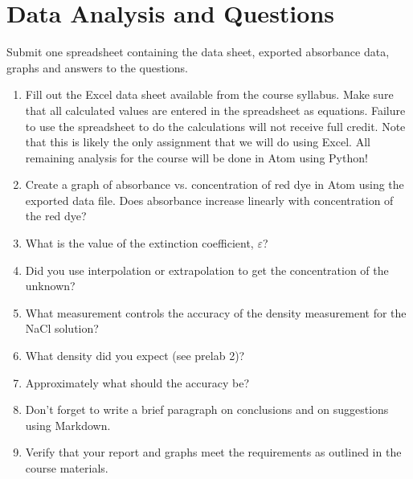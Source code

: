 \documentclass[letterpaper,10pt,english]{sphinxmanual}
\begin{document}
\section{Data Analysis and Questions}
\label{\detokenize{Laboratory_Measurements/Laboratory_Measurements:data-analysis-and-questions}}\label{\detokenize{Laboratory_Measurements/Laboratory_Measurements:heading-laboratory-measurements-and-procedures-data-analysis-and-questions}}
Submit one spreadsheet containing the data sheet, exported absorbance data, graphs and answers to the questions.
\begin{enumerate}
\item {} 
Fill out the Excel data sheet available from the course syllabus. Make sure that all calculated values are entered in the spreadsheet as equations. Failure to use the spreadsheet to do the calculations will not receive full credit. Note that this is likely the only assignment that we will do using Excel. All remaining analysis for the course will be done in Atom using Python!

\item {} 
Create a graph of absorbance vs. concentration of red dye  in Atom using the exported data file. Does absorbance increase linearly with concentration of the red dye?

\item {} 
What is the value of the extinction coefficient, \(\varepsilon\)?

\item {} 
Did you use interpolation or extrapolation to get the concentration of the unknown?

\item {} 
What measurement controls the accuracy of the density measurement for the NaCl solution?

\item {} 
What density did you expect (see prelab 2)?

\item {} 
Approximately what should the accuracy be?

\item {} 
Don’t forget to write a brief paragraph on conclusions and on suggestions using Markdown.

\item {} 
Verify that your report and graphs meet the requirements as outlined in the course materials.

\end{enumerate}
\end{document}
